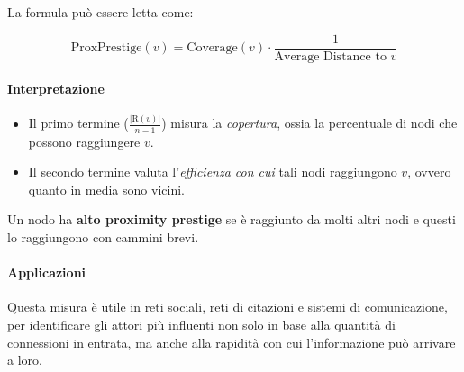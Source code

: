 La formula può essere letta come:

\[
\text{ProxPrestige}(v) = \text{Coverage}(v) \cdot \frac{1}{\text{Average Distance to } v}
\]

\paragraph{Interpretazione}

\begin{itemize}
    \item Il primo termine (\( \frac{|\text{R}(v)|}{n-1} \)) misura la \textit{copertura}, ossia la percentuale di nodi che possono raggiungere \( v \).
    \item Il secondo termine valuta l'\textit{efficienza con cui} tali nodi raggiungono \( v \), ovvero quanto in media sono vicini.
\end{itemize}

Un nodo ha \textbf{alto proximity prestige} se è raggiunto da molti altri nodi e questi lo raggiungono con cammini brevi.

\paragraph{Applicazioni}

Questa misura è utile in reti sociali, reti di citazioni e sistemi di comunicazione, per identificare gli attori più influenti non solo in base alla quantità di connessioni in entrata, ma anche alla rapidità con cui l’informazione può arrivare a loro.

